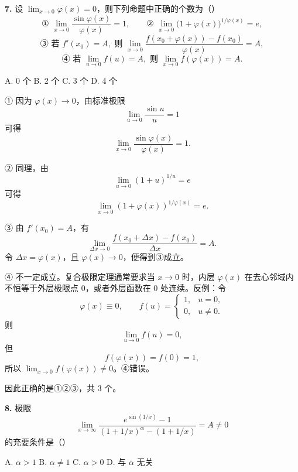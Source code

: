 \begin{problemblock}
\textbf{7.} 设 \(\lim_{x\to0}\varphi(x)=0\)，则下列命题中正确的个数为（\quad）
\[
\text{① }\lim_{x\to0}\frac{\sin\varphi(x)}{\varphi(x)}=1,
\qquad
\text{② }\lim_{x\to0}\bigl(1+\varphi(x)\bigr)^{1/\varphi(x)}=e,
\]
\[
\text{③ 若 }f'(x_0)=A,\text{ 则 }
\lim_{x\to0}\frac{f(x_0+\varphi(x))-f(x_0)}{\varphi(x)}=A,
\]
\[
\text{④ 若 }\lim_{u\to0}f(u)=A,\text{ 则 }
\lim_{x\to0}f(\varphi(x))=A.
\]

A. 0 个 \qquad B. 2 个 \qquad C. 3 个 \qquad D. 4 个
\end{problemblock}

\begin{solutionblock}

① 因为 \(\varphi(x)\to0\)，由标准极限
\[
\lim_{u\to0}\frac{\sin u}{u}=1
\]
可得
\[
\lim_{x\to0}\frac{\sin\varphi(x)}{\varphi(x)}=1.
\]

② 同理，由
\[
\lim_{u\to0}(1+u)^{1/u}=e
\]
可得
\[
\lim_{x\to0}(1+\varphi(x))^{1/\varphi(x)}=e.
\]

③ 由 \(f'(x_0)=A\)，有
\[
\lim_{\Delta x\to0}
\frac{f(x_0+\Delta x)-f(x_0)}{\Delta x}=A.
\]
令 \(\Delta x=\varphi(x)\)，且 \(\varphi(x)\to0\)，便得到③成立。

④ 不一定成立。复合极限定理通常要求当 \(x\to0\) 时，内层 \(\varphi(x)\) 在去心邻域内不恒等于外层极限点 \(0\)，或者外层函数在 \(0\) 处连续。反例：令
\[
\varphi(x)\equiv0,\qquad
f(u)=
\begin{cases}
1,&u=0,\\
0,&u\ne0.
\end{cases}
\]
则
\[
\lim_{u\to0}f(u)=0,
\]
但
\[
f(\varphi(x))=f(0)=1,
\]
所以 \(\lim_{x\to0}f(\varphi(x))\ne0\)。④错误。

因此正确的是①②③，共 3 个。

\end{solutionblock}

\begin{problemblock}
\textbf{8.} 极限
\[
\lim_{x\to\infty}
\frac{e^{\sin(1/x)}-1}
{(1+1/x)^\alpha-(1+1/x)}
=A\ne0
\]
的充要条件是（\quad）

A. \(\alpha>1\) \qquad B. \(\alpha\ne1\) \qquad C. \(\alpha>0\) \qquad D. 与 \(\alpha\) 无关
\end{problemblock}

